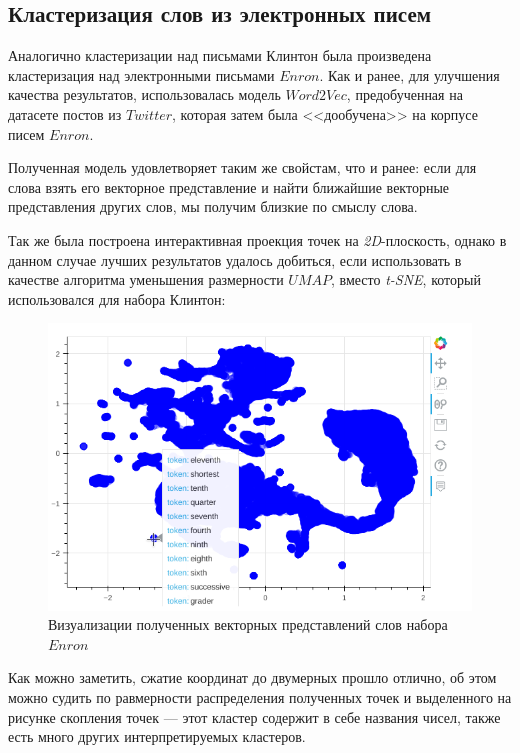 \subsection{Кластеризация слов из электронных писем}

Аналогично кластеризации над письмами Клинтон была произведена кластеризация над 
электронными письмами $Enron$. Как и ранее, для улучшения качества результатов,
использовалась модель $Word2Vec$, предобученная на датасете постов из $Twitter$, которая затем была <<дообучена>> на корпусе писем $Enron$.

Полученная модель удовлетворяет таким же свойстам, что и ранее: если для слова
взять его векторное представление и найти ближайшие векторные представления других слов, мы
получим близкие по смыслу слова.

Так же была построена интерактивная проекция точек на \textit{2D}-плоскость, однако в данном
случае лучших результатов удалось добиться, если использовать в качестве алгоритма уменьшения размерности $UMAP$, вместо \textit{t-SNE}, который использовался для набора Клинтон:

\begin{figure}[H]
\centering
\includegraphics[scale=0.9]{pics/points-2.png}
\caption{Визуализации полученных векторных представлений слов набора $Enron$}
\end{figure}

Как можно заметить, сжатие координат до двумерных прошло отлично, об этом можно судить 
по равмерности распределения полученных точек и выделенного на рисунке скопления точек ---
этот кластер содержит в себе названия чисел, также есть много других интерпретируемых кластеров.


